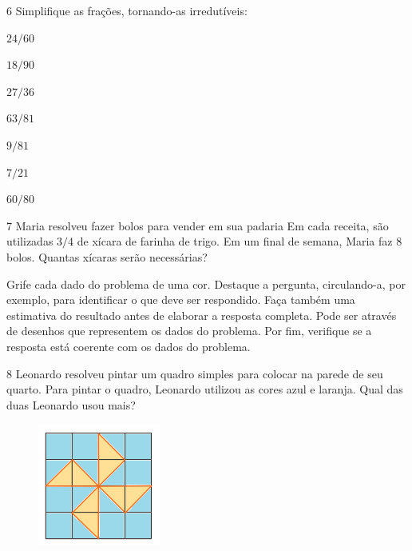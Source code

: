\num{6}  Simplifique as frações, tornando-as irredutíveis:

\begin{escolha}
\item $24/60$   
\item $18/90$   
\item $27/36$   
\item $63/81$   
\item $9/81$   
\item $7/21$   
\item $60/80$   
\end{escolha}

\num{7}  Maria resolveu fazer bolos para vender em sua padaria Em cada
receita, são utilizadas $3/4$ de xícara de farinha de trigo. Em um final
de semana, Maria faz $8$ bolos. Quantas xícaras serão necessárias?


\noindent Grife cada dado do problema de uma cor. Destaque a pergunta, circulando-a, por exemplo,
para identificar o que deve ser respondido. Faça também uma estimativa do resultado antes de elaborar a resposta completa. Pode ser através de desenhos que representem os dados do problema. Por fim, verifique se a resposta está coerente com os dados do problema.

\num{8}  Leonardo resolveu pintar um quadro simples para colocar na parede de
seu quarto. Para pintar o quadro, Leonardo utilizou as cores azul e laranja. Qual
das duas Leonardo usou mais?

\begin{figure}
\includegraphics[width=1.58333in,height=1.57292in]{./imgSAEB_6_MAT/media/image33.png}
\end{figure}


